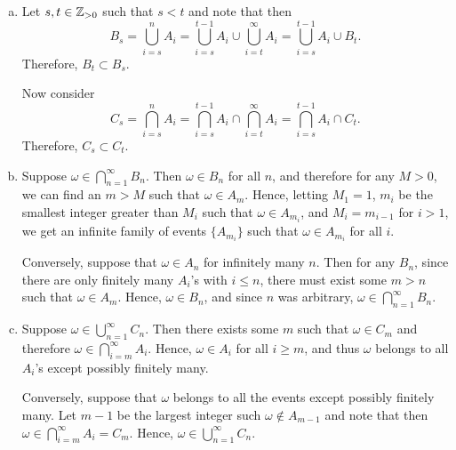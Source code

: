 \begin{ex}
  \begin{enumerate}[(a)]
    \item Let $s,t\in\mathbb{Z}_{>0}$ such that $s<t$ and note that then
          \[
            B_s
            =\bigcup_{i=s}^n A_i
            =\bigcup_{i=s}^{t-1} A_i \cup \bigcup_{i=t}^\infty A_i
            =\bigcup_{i=s}^{t-1} A_i\cup B_t.
          \]
          Therefore, $B_t \subset B_s$.

          Now consider
          \[
            C_s
            =\bigcap_{i=s}^n A_i
            =\bigcap_{i=s}^{t-1} A_i \cap \bigcap_{i=t}^\infty A_i
            =\bigcap_{i=s}^{t-1} A_i\cap C_t.
          \]
          Therefore, $C_s\subset C_t$.

    \item Suppose $\omega\in \bigcap_{n=1}^\infty B_n$. Then $\omega\in B_n$ for
          all $n$, and therefore for any $M>0$, we can find an $m>M$ such that
          $\omega\in A_m$. Hence, letting $M_1=1$, $m_i$ be the smallest integer
          greater than $M_i$ such that $\omega\in A_{m_i}$, and $M_i=m_{i-1}$
          for $i>1$, we get an infinite family of events $\{A_{m_i}\}$ such that
          $\omega\in A_{m_i}$ for all $i$.

          Conversely, suppose that $\omega\in A_n$ for infinitely many $n$. Then
          for any $B_n$, since there are only finitely many $A_i$'s with
          $i\leq n$, there must exist some $m>n$ such that $\omega\in A_m$.
          Hence, $\omega\in B_n$, and since $n$ was arbitrary,
          $\omega\in \bigcap_{n=1}^\infty B_n$.

    \item Suppose $\omega\in \bigcup_{n=1}^\infty C_n$. Then there exists some
          $m$ such that $\omega\in C_m$ and therefore
          $\omega\in\bigcap_{i=m}^\infty A_i$. Hence, $\omega\in A_i$ for all
          $i\geq m$, and thus $\omega$ belongs to all $A_i$'s except possibly
          finitely many.

          Conversely, suppose that $\omega$ belongs to all the events except
          possibly finitely many. Let $m-1$ be the largest integer such
          $\omega\not\in A_{m-1}$ and note that then
          $\omega\in \bigcap_{i=m}^\infty A_i=C_m$. Hence,
          $\omega\in \bigcup_{n=1}^\infty C_n$.
  \end{enumerate}
\end{ex}

